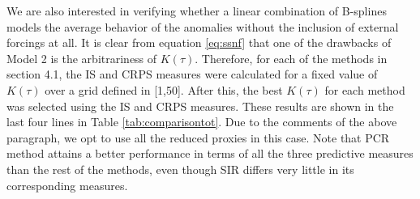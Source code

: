 \documentclass[11pt]{amsart}
\theoremstyle{plain}
\theoremstyle{definition}
\theoremstyle{remark}
\begin{document}
We are also interested in verifying whether a linear combination of B-splines
models the average behavior of the anomalies without the inclusion of external
forcings at all. It is clear from equation \eqref{eq:ssnf} that one of the
drawbacks of Model 2 is the arbitrariness of $K(\tau)$. Therefore, for each of
the methods in section 4.1, the IS and CRPS measures were calculated for a fixed
value of $K(\tau)$ over a grid defined in [1,50]. After this, the best $K(\tau)$
for each method was selected using the IS and CRPS measures. These results are
shown in the last four lines in Table \ref{tab:comparisontot}. Due to the comments of the above paragraph, we opt to
use all the reduced proxies in this case.
Note that PCR method attains a better performance in terms of all the three
predictive measures than the
rest of the methods, even though SIR differs very little in its corresponding
measures. 
\end{document}
